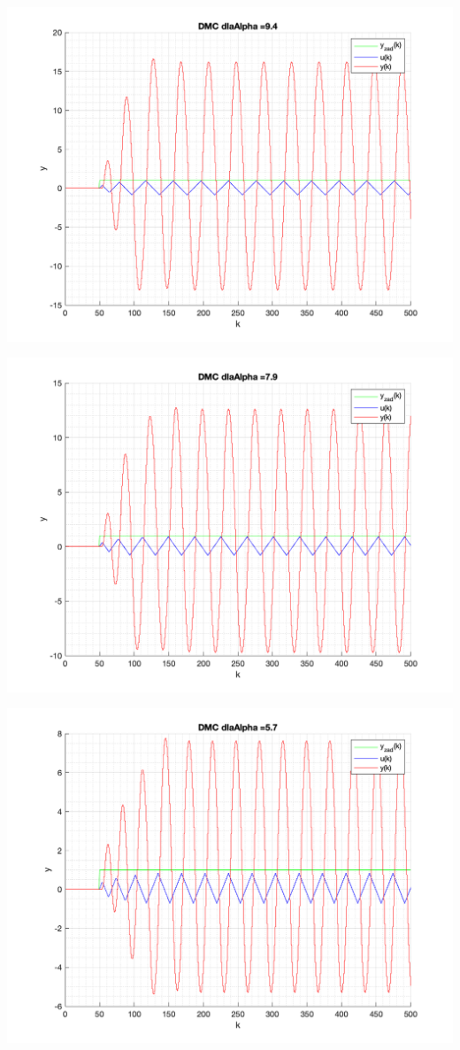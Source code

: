 \documentclass[a4paper, 11pt]{article}
\begin{document}
\begin{enumerate}
 \includegraphics[width=\linewidth]{./ModelsDodatkowe_Alpha/P4_DMC_Alpha_9_4_png.png} 
 
 \includegraphics[width=\linewidth]{./ModelsDodatkowe_Alpha/P4_DMC_Alpha_7_9_png.png} 
 
 \includegraphics[width=\linewidth]{./ModelsDodatkowe_Alpha/P4_DMC_Alpha_5_7_png.png} 
 

\end{enumerate}
\end{document}
